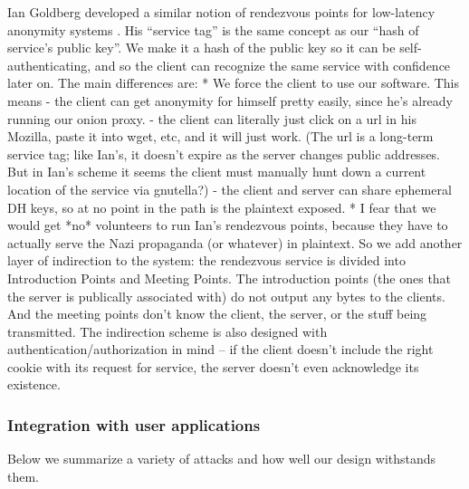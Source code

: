 \documentclass[times,10pt,twocolumn]{article}
\begin{document}
Ian Goldberg developed a similar notion of rendezvous points for
low-latency anonymity systems \cite{goldberg-thesis}. His ``service tag''
is the same concept as our ``hash of service's public key''. We make it
a hash of the public key so it can be self-authenticating, and so the
client can recognize the same service with confidence later on.
The main differences are:
* We force the client to use our software. This means
   - the client can get anonymity for himself pretty easily, since he's
     already running our onion proxy.
   - the client can literally just click on a url in his Mozilla, paste it
     into wget, etc, and it will just work. (The url is a long-term
     service tag; like Ian's, it doesn't expire as the server changes
     public addresses. But in Ian's scheme it seems the client must
     manually hunt down a current location of the service via gnutella?)
   - the client and server can share ephemeral DH keys, so at no point
     in the path is the plaintext exposed.
* I fear that we would get *no* volunteers to run Ian's rendezvous points,
  because they have to actually serve the Nazi propaganda (or whatever)
  in plaintext. So we add another layer of indirection to the system:
  the rendezvous service is divided into Introduction Points and
  Meeting Points. The introduction points (the ones that the server is
  publically associated with) do not output any bytes to the clients. And
  the meeting points don't know the client, the server, or the stuff
  being transmitted. The indirection scheme is also designed with
  authentication/authorization in mind -- if the client doesn't include
  the right cookie with its request for service, the server doesn't even
  acknowledge its existence.


\subsubsection{Integration with user applications}

\label{sec:maintaining-anonymity}

\label{subsec:many-messages}


\label{sec:attacks}

Below we summarize a variety of attacks and how well our design withstands
them.

\end{document}
